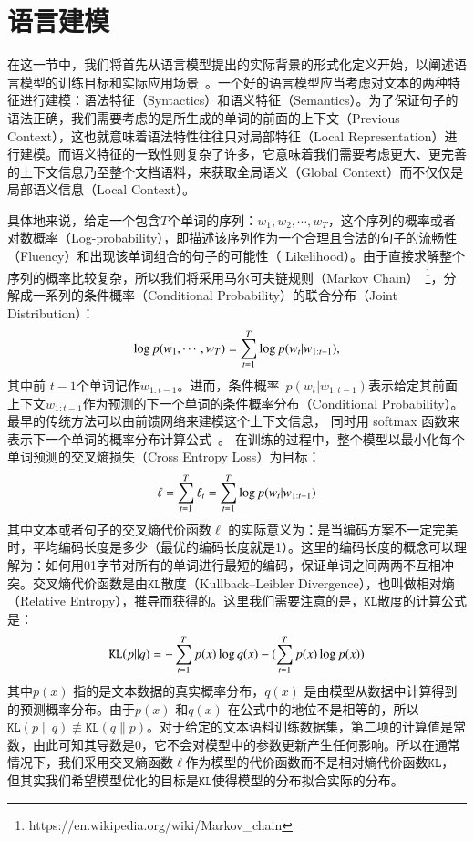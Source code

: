 \section{语言建模}
在这一节中，我们将首先从语言模型提出的实际背景的形式化定义开始，以阐述语言模型的训练目标和实际应用场景~。一个好的语言模型应当考虑对文本的两种特征进行建模：语法特征（Syntactics）和语义特征（Semantics）。为了保证句子的语法正确，我们需要考虑的是所生成的单词的前面的上下文（Previous Context），这也就意味着语法特性往往只对局部特征（Local Representation）进行建模。而语义特征的一致性则复杂了许多，它意味着我们需要考虑更大、更完善的上下文信息乃至整个文档语料，来获取全局语义（Global Context）而不仅仅是局部语义信息（Local Context）。


具体地来说，给定一个包含$T$个单词的序列：$w_1,w_2,\cdots,w_T$，这个序列的概率或者对数概率（Log-probability），即描述该序列作为一个合理且合法的句子的流畅性（Fluency）和出现该单词组合的句子的可能性（ Likelihood）。由于直接求解整个序列的概率比较复杂，所以我们将采用马尔可夫链规则（Markov Chain）~\footnote{https://en.wikipedia.org/wiki/Markov\_chain}，分解成一系列的条件概率（Conditional Probability）的联合分布（Joint Distribution）：
\begin{equation}\label{laguage_model}
\setlength{\abovedisplayskip}{10pt}
\setlength{\belowdisplayskip}{10pt}
 \log p(w_1,\cdots, w_T ) = \sum_{t=1}^T \log p(w_t | w_{1:t-1}),
\end{equation}
其中前 $t-1$个单词记作$w_ {1:t-1}$。进而，条件概率~$p(w_t | w_ {1:t-1})$表示给定其前面上下文$w_ {1:t-1} $作为预测的下一个单词的条件概率分布（Conditional Probability）。最早的传统方法可以由前馈网络来建模这个上下文信息， 同时用 softmax 函数来表示下一个单词的概率分布计算公式~。 在训练的过程中，整个模型以最小化每个单词预测的交叉熵损失（Cross Entropy Loss）为目标：
\begin{equation}\label{equ:losses2}
\setlength{\abovedisplayskip}{10pt}
\setlength{\belowdisplayskip}{10pt}
  \ell=\sum_{t=1}^{T}\ell_t=\sum_{t=1}^{T}\log p(w_t | w_{1:t-1})
\end{equation}
其中文本或者句子的交叉熵代价函数$\ell$ 的实际意义为：是当编码方案不一定完美时，平均编码长度是多少（最优的编码长度就是1）。这里的编码长度的概念可以理解为：如何用01字节对所有的单词进行最短的编码，保证单词之间两两不互相冲突。交叉熵代价函数是由$\texttt{KL}$散度（Kullback–Leibler Divergence），也叫做相对熵（Relative Entropy），推导而获得的。这里我们需要注意的是，$\mathtt{KL}$散度的计算公式是：
\begin{equation}\label{equ:losses}
\setlength{\abovedisplayskip}{10pt}
\setlength{\belowdisplayskip}{10pt}
  \mathtt{KL}(p||q)=-\sum_{t=1}^{T}p(x)\log q(x) - (\sum_{t=1}^{T}p(x)\log p(x))
\end{equation}
其中$p(x)$ 指的是文本数据的真实概率分布，$q(x)$ 是由模型从数据中计算得到的预测概率分布。由于$p(x)$ 和$q(x)$ 在公式中的地位不是相等的，所以$\texttt{KL} (p\parallel q)\not\equiv \texttt{KL}(q\parallel p)$。对于给定的文本语料训练数据集，第二项的计算值是常数，由此可知其导数是0，它不会对模型中的参数更新产生任何影响。所以在通常情况下，我们采用交叉熵函数$\ell$作为模型的代价函数而不是相对熵代价函数$\mathtt{KL}$，但其实我们希望模型优化的目标是$\mathtt{KL}$使得模型的分布拟合实际的分布。
